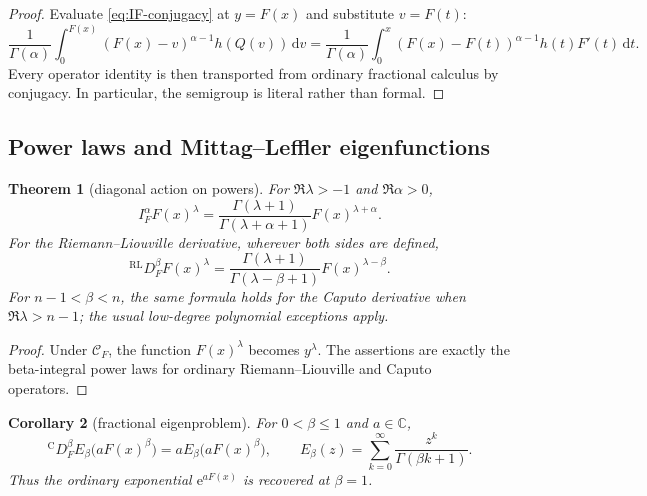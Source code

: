 \documentclass[11pt,oneside]{article}
\numberwithin{equation}{section}
\theoremstyle{plain}
\newtheorem{theorem}{Theorem}[section]
\newtheorem{corollary}[theorem]{Corollary}
\theoremstyle{definition}
\theoremstyle{remark}
\newcommand{\C}{\mathbb C}
\newcommand{\dd}{\,\mathrm d}
\newcommand{\e}{\mathrm e}
\newcommand{\Ccap}{\mathrm C}
\begin{document}
\begin{proof}
Evaluate \cref{eq:IF-conjugacy} at $y=F(x)$ and substitute $v=F(t)$:
\[
 \frac1{\Gamma(\alpha)}\int_0^{F(x)}
 (F(x)-v)^{\alpha-1}h(Q(v))\dd v
 =\frac1{\Gamma(\alpha)}\int_0^x
 (F(x)-F(t))^{\alpha-1}h(t)F'(t)\dd t.
\]
Every operator identity is then transported from ordinary fractional calculus
by conjugacy.  In particular, the semigroup is literal rather than formal.
\end{proof}

\subsection{Power laws and Mittag--Leffler eigenfunctions}

\begin{theorem}[diagonal action on powers]
For $\Re\lambda>-1$ and $\Re\alpha>0$,
\begin{equation}
 I_F^\alpha F(x)^\lambda
 =\frac{\Gamma(\lambda+1)}{\Gamma(\lambda+\alpha+1)}
  F(x)^{\lambda+\alpha}.
 \label{eq:F-clock-power-integral}
\end{equation}
For the Riemann--Liouville derivative, wherever both sides are defined,
\begin{equation}
 {}^{\mathrm{RL}}D_F^\beta F(x)^\lambda
 =\frac{\Gamma(\lambda+1)}{\Gamma(\lambda-\beta+1)}
  F(x)^{\lambda-\beta}.
 \label{eq:F-clock-power-RL}
\end{equation}
For $n-1<\beta<n$, the same formula holds for the Caputo derivative when
$\Re\lambda>n-1$; the usual low-degree polynomial exceptions apply.
\end{theorem}

\begin{proof}
Under $\mathcal C_F$, the function $F(x)^\lambda$ becomes $y^\lambda$.
The assertions are exactly the beta-integral power laws for ordinary
Riemann--Liouville and Caputo operators.
\end{proof}

\begin{corollary}[fractional eigenproblem]
For $0<\beta\le1$ and $a\in\C$,
\begin{equation}
 {}^{\Ccap}D_F^\beta
 E_\beta\bigl(aF(x)^\beta\bigr)
 =aE_\beta\bigl(aF(x)^\beta\bigr),
 \qquad
 E_\beta(z)=\sum_{k=0}^{\infty}\frac{z^k}{\Gamma(\beta k+1)}.
 \label{eq:F-clock-Mittag}
\end{equation}
Thus the ordinary exponential $\e^{aF(x)}$ is recovered at $\beta=1$.
\end{corollary}
\end{document}

